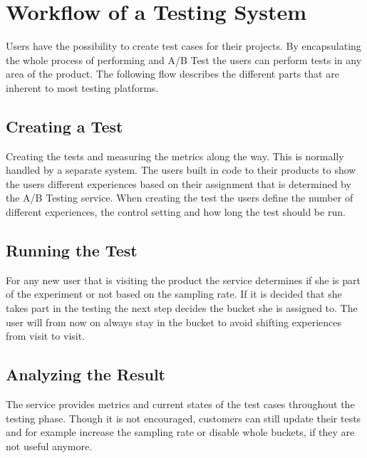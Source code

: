 \documentclass[main.tex]{subfiles}
\begin{document}
\section{Workflow of a Testing System}
Users have the possibility to create test cases for their projects. By encapsulating the whole process of performing and A/B Test the users can perform tests in any area of the product. The following flow describes the different parts that are inherent to most testing platforms.
\subsection{Creating a Test} 
Creating the tests and measuring the metrics along the way. This is normally handled by a separate system. The users built in code to their products to show the users different experiences based on their assignment that is determined by the A/B Testing service. When creating the test the users define the number of different experiences, the control setting and how long the test should be run.
\subsection{Running the Test}
For any new user that is visiting the product the service determines if she is part of the experiment or not based on the sampling rate. If it is decided that she takes part in the testing the next step decides the bucket she is assigned to. The user will from now on always stay in the bucket to avoid shifting experiences from visit to visit.
\subsection{Analyzing the Result}
The service provides metrics and current states of the test cases throughout the testing phase. Though it is not encouraged, customers can still update their tests and for example increase the sampling rate or disable whole buckets, if they are not useful anymore.
\end{document}
